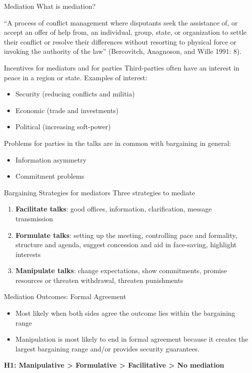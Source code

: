 \documentclass[xcolor=table,usenames,dvipsnames]{beamer}
\begin{document}
\begin{frame}{Mediation}
What is mediation? \pause

``A process of conflict management where disputants seek the assistance of, or accept an offer of help from, an individual, group, state, or organization to settle their conflict or resolve their differences without resorting to physical force or invoking the authority of the law'' (Bercovitch, Anagnoson, and Wille 1991: 8).
\end{frame}

\begin{frame}{Incentives for mediators and for parties}
Third-parties often have an interest in peace in a region or state. Examples of interest: \pause
\begin{itemize}
\item Security (reducing conflicts and militia) \pause
\item Economic (trade and investments) \pause
\item Political (increasing soft-power)  \pause
\end{itemize}

Problems for parties in the talks are in common with bargaining in general: \pause
\begin{itemize}
\item Information asymmetry
\item Commitment problems 
\end{itemize}
\end{frame}

\begin{frame}{Bargaining Strategies for mediators}
Three strategies to mediate \pause
\begin{enumerate}
\item \textbf{Facilitate talks}: good offices, information, clarification, message transmission \pause
\item \textbf{Formulate talks}: setting up the meeting, controlling pace and formality, structure and agenda, suggest concession and aid in face-saving, highlight interests \pause
\item \textbf{Manipulate talks}: change expectations, show commitments, promise resources or threaten withdrawal, threaten punishments
\end{enumerate}
\end{frame}

\begin{frame}{Mediation Outcomes: Formal Agreement}
\begin{itemize}
\item Most likely when both sides agree the outcome lies within the bargaining range
\item Manipulation is most likely to end in formal agreement because it creates the largest bargaining range and/or provides security guarantees.
\end{itemize} \pause

\textbf{H1: Manipulative > Formulative > Facilitative > No mediation}
\end{frame}
\end{document}
